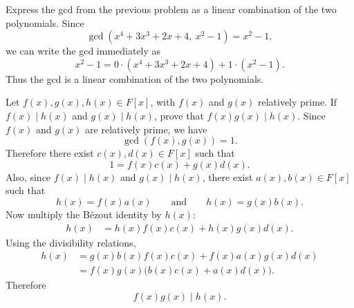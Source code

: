 \begin{problem}{
    Express the gcd from the previous problem as a linear combination of the two polynomials.
}
    Since
    \[
        \gcd(x^4+3x^3+2x+4,\ x^2-1)=x^2-1,
    \]
    we can write the gcd immediately as
    \[
        x^2-1
        =
        0\cdot (x^4+3x^3+2x+4)+1\cdot (x^2-1).
    \]
    Thus the gcd is a linear combination of the two polynomials.
\end{problem}

\begin{problem}{
    Let $f(x),g(x),h(x)\in F[x]$, with $f(x)$ and $g(x)$ relatively prime.
    If $f(x)\mid h(x)$ and $g(x)\mid h(x)$, prove that $f(x)g(x)\mid h(x)$.
}
    Since $f(x)$ and $g(x)$ are relatively prime, we have
    \[
        \gcd(f(x),g(x))=1.
    \]
    Therefore there exist $c(x),d(x)\in F[x]$ such that
    \[
        1=f(x)c(x)+g(x)d(x).
    \]
    Also, since $f(x)\mid h(x)$ and $g(x)\mid h(x)$, there exist $a(x),b(x)\in F[x]$ such that
    \[
        h(x)=f(x)a(x)
        \qquad\text{and}\qquad
        h(x)=g(x)b(x).
    \]
    Now multiply the Bézout identity by $h(x)$:
    \begin{align*}
        h(x)
        &=
        h(x)f(x)c(x)+h(x)g(x)d(x).
    \end{align*}
    Using the divisibility relations,
    \begin{align*}
        h(x)
        &=
        g(x)b(x)f(x)c(x)+f(x)a(x)g(x)d(x)\\
        &=
        f(x)g(x)\bigl(b(x)c(x)+a(x)d(x)\bigr).
    \end{align*}
    Therefore
    \[
        f(x)g(x)\mid h(x).
    \]
\end{problem}


